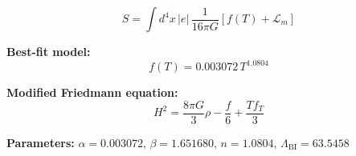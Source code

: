 
\begin{equation}
  S = \int d^4x \, |e| \, \frac{1}{16\pi G} \left[ f(T) + \mathcal{L}_m \right]
\end{equation}

\textbf{Best-fit model:}
\begin{equation}
  f(T) = 0.003072 \, T^{1.0804}
\end{equation}

\textbf{Modified Friedmann equation:}
\begin{equation}
  H^2 = \frac{8\pi G}{3} \rho - \frac{f}{6} + \frac{T f_T}{3}
\end{equation}

\textbf{Parameters:}
$\alpha = 0.003072$, \quad
$\beta = 1.651680$, \quad
$n = 1.0804$, \quad
$\Lambda_{\text{BI}} = 63.5458$